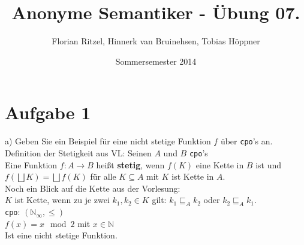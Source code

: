 \documentclass[ngerman,a4paper]{report}
\author{Florian Ritzel, Hinnerk van Bruinehsen, Tobias Höppner}
\title{Anonyme Semantiker - Übung 07. }
\date{Sommersemester 2014}
\renewcommand{\maketitle}{}
\begin{document}
\maketitle
\section*{Aufgabe 1}
\begin{compactenum}
\item[a)] Geben Sie ein Beispiel für eine nicht stetige Funktion $f$ über \lstinline!cpo!'s an.\\
Definition der Stetigkeit aus VL: Seinen $A$ und $B$ \lstinline!cpo!'s\\
Eine Funktion $f: A \rightarrow B$ heißt \textbf{stetig}, wenn $f(K)$ eine Kette in $B$ ist und $f(\bigsqcup K) = \bigsqcup f(K)$ für alle $K \subseteq A$ mit $K$ ist Kette in $A$.\\

Noch ein Blick auf die Kette aus der Vorlesung:\\
$K$ ist Kette, wenn zu je zwei $k_1, k_2 \in K$ gilt: $k_1 \sqsubseteq_A k_2$ oder $k_2 \sqsubseteq_A k_1$.\\

\lstinline!cpo!: $(\mathbb{N}_\infty,\leq)$\\
$f(x) = x \mod 2$ mit $x \in \mathbb{N}$\\
Ist eine nicht stetige Funktion.\\



\end{compactenum}
\end{document}
